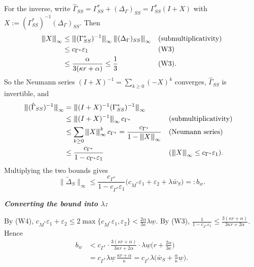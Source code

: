 \documentclass[11pt,a4paper]{article}
\numberwithin{equation}{section}
\theoremstyle{plain}
\theoremstyle{remark}
\newcommand{\opnorm}[1]{{\vert\kern-0.25ex\vert\kern-0.25ex\vert #1 \vert\kern-0.25ex\vert\kern-0.25ex\vert}}
\begin{document}
For the inverse, write $\hat\Gamma_{SS}=\Gamma^*_{SS}+(\Delta_\Gamma)_{SS}=\Gamma^*_{SS}(I+X)$ with $X:=(\Gamma^*_{SS})^{-1}(\Delta_\Gamma)_{SS}$. Then
\begin{align*}
\opnorm{X}_\infty
&\le\opnorm{(\Gamma^*_{SS})^{-1}}_\infty\,\opnorm{(\Delta_\Gamma)_{SS}}_\infty && \text{(submultiplicativity)}\\
&\le c_{\Gamma^*}\varepsilon_1 && \text{(W3)}\\
&\le\frac{\alpha}{3(\kappa r+\alpha)}\le\frac13 && \text{(W3)}.
\end{align*}
So the Neumann series $(I+X)^{-1}=\sum_{k\ge0}(-X)^k$ converges, $\hat\Gamma_{SS}$ is invertible, and
\begin{align}
\opnorm{(\hat\Gamma_{SS})^{-1}}_\infty
&=\opnorm{(I+X)^{-1}(\Gamma^*_{SS})^{-1}}_\infty\notag\\
&\le\opnorm{(I+X)^{-1}}_\infty\,c_{\Gamma^*} && \text{(submultiplicativity)}\notag\\
&\le\sum_{k\ge0}\opnorm{X}_\infty^k\,c_{\Gamma^*}=\frac{c_{\Gamma^*}}{1-\opnorm{X}_\infty} && \text{(Neumann series)}\notag\\
&\le\frac{c_{\Gamma^*}}{1-c_{\Gamma^*}\varepsilon_1} && (\opnorm{X}_\infty\le c_{\Gamma^*}\varepsilon_1).\label{eq:inv}
\end{align}
Multiplying the two bounds gives
\begin{equation}\label{eq:errbound}
\|\tilde\Delta_S\|_\infty\le\frac{c_{\Gamma^*}}{1-c_{\Gamma^*}\varepsilon_1}\big(c_{M^*}\varepsilon_1+\varepsilon_2+\lambda\bar w_S\big)=:b_w.
\end{equation}

\emph{\textbf{Converting the bound into $\lambda$:}}

By (W4), $c_{M^*}\varepsilon_1+\varepsilon_2\le2\max\{c_{M^*}\varepsilon_1,\varepsilon_2\}<\frac{2\alpha}{3\kappa}\lambda\underline w$. By (W3), $\frac{1}{1-c_{\Gamma^*}\varepsilon_1}\le\frac{3(\kappa r+\alpha)}{3\kappa r+2\alpha}$. Hence
\begin{equation}\label{eq:bwlambda}
\begin{split}
b_w&<c_{\Gamma^*}\cdot\frac{3(\kappa r+\alpha)}{3\kappa r+2\alpha}\cdot\lambda\underline w\Big(r+\frac{2\alpha}{3\kappa}\Big)\\
&=c_{\Gamma^*}\lambda\underline w\,\frac{\kappa r+\alpha}{\kappa}=c_{\Gamma^*}\lambda\Big(\bar w_S+\frac{\alpha}{\kappa}\underline w\Big).
\end{split}
\end{equation}
\end{document}
